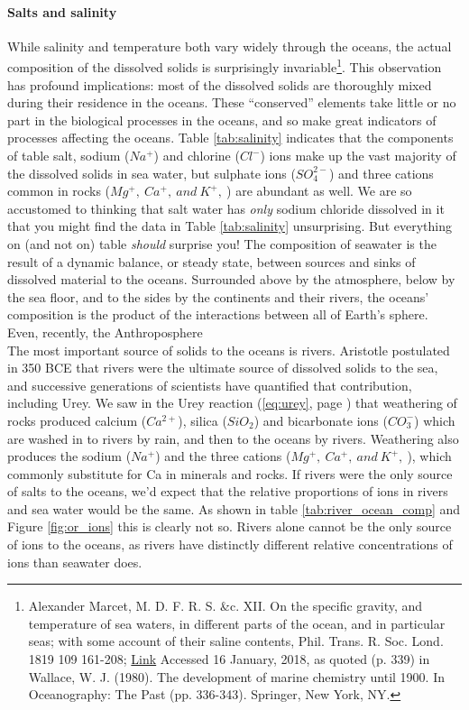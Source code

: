 \paragraph{Salts and salinity}
While salinity and temperature both vary widely through the oceans, the actual composition of the dissolved solids is surprisingly invariable\footnote{Alexander Marcet, M. D. F. R. S. \&c. XII. On the specific gravity, and temperature of sea waters, in different parts of the ocean, and in particular seas; with some account of their saline contents, Phil. Trans. R. Soc. Lond. 1819 109 161-208; \href{doi:10.1098/rstl.1819.0014 2053-9223}{Link} Accessed 16 January, 2018, as quoted (p. 339) in Wallace, W. J. (1980). The development of marine chemistry until 1900. In Oceanography: The Past (pp. 336-343). Springer, New York, NY.}. This observation has profound implications: most of the dissolved solids are thoroughly mixed during their residence in the oceans. These ``conserved'' elements take little or no part in the biological processes in the oceans, and so make great indicators of processes affecting the oceans. Table \ref{tab:salinity} indicates that the components of table salt, sodium ($Na^+$) and chlorine ($Cl^-$) ions make up the vast majority of the dissolved solids in sea water, but sulphate ions ($SO_4^{2-}$) and three cations common in rocks ($Mg^+,\ Ca^+,\ and\ K^+,\ $) are abundant as well. We are so accustomed to thinking that salt water has \emph{only} sodium chloride dissolved in it that you might find the data in Table \ref{tab:salinity} unsurprising. But everything on (and not on) table \emph{should} surprise you! The composition of seawater is the result of a dynamic balance, or steady state, between sources and sinks of dissolved material to the oceans. Surrounded above by the atmosphere, below by the sea floor, and to the sides by the continents and their rivers, the oceans' composition is the product of the interactions between all of Earth's sphere. Even, recently, the Anthroposphere\\

The most important source of solids to the oceans is rivers. Aristotle postulated in 350 BCE that rivers were the ultimate source of dissolved solids to the sea, and successive generations of scientists have quantified that contribution, including Urey. We saw in the Urey reaction (\ref{eq:urey}, page \pageref{eq:urey}) that weathering of rocks produced calcium ($Ca^{2+}$), silica ($SiO_2$) and bicarbonate ions ($CO_3^-$) which are washed in to rivers by rain, and then to the oceans by rivers. Weathering also produces the sodium ($Na^+$) and the three cations ($Mg^+,\ Ca^+,\ and\ K^+,\ $), which commonly substitute for Ca in minerals and rocks. If rivers were the only source of salts to the oceans, we'd expect that the relative proportions of ions in rivers and sea water would be the same. As shown in table \ref{tab:river_ocean_comp} and Figure \ref{fig:or_ions} this is clearly not so. Rivers alone cannot be the only source of ions to the oceans, as rivers have distinctly different relative concentrations of ions than seawater does.\\

